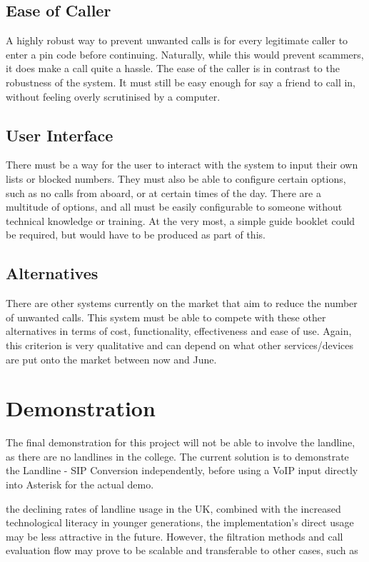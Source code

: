 \documentclass[main.tex]{subfiles}
\begin{document}
\subsection{Ease of Caller}
A highly robust way to prevent unwanted calls is for every legitimate caller to enter a pin code before continuing. Naturally, while this would prevent scammers, it does make a call quite a hassle. The ease of the caller is in contrast to the robustness of the system. It must still be easy enough for say a friend to call in, without feeling overly scrutinised by a computer.
\subsection{User Interface}
There must be a way for the user to interact with the system to input their own lists or blocked numbers. They must also be able to configure certain options, such as no calls from aboard, or at certain times of the day. There are a multitude of options, and all must be easily configurable to someone without technical knowledge or training. At the very most, a simple guide booklet could be required, but would have to be produced as part of this.
\subsection{Alternatives}
There are other systems currently on the market that aim to reduce the number of unwanted calls. This system must be able to compete with these other alternatives in terms of cost, functionality, effectiveness and ease of use. Again, this criterion is very qualitative and can depend on what other services/devices are put onto the market between now and June.
\section{Demonstration}
The final demonstration for this project will not be able to involve the landline, as there are no landlines in the college. The current solution is to demonstrate the Landline - SIP Conversion independently, before using a VoIP input directly into Asterisk for the actual demo.


the declining rates of landline usage in the UK, combined with the increased technological literacy in younger generations, the implementation’s direct usage may be less attractive in the future. However, the filtration methods and call evaluation flow may prove to be scalable and transferable to other cases, such as
\end{document}
